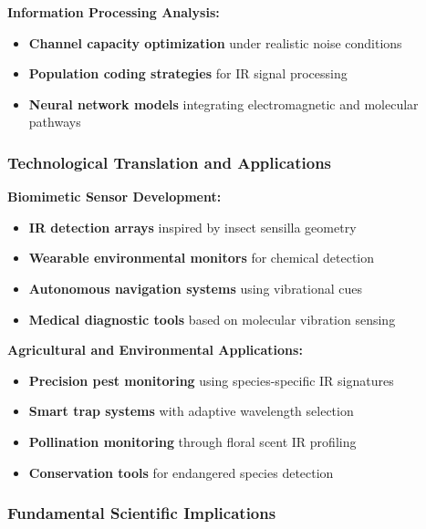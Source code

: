 \documentclass[
  13pt,
  a4paperpaper,
  12pt]{article}
\providecommand{\tightlist}{%
  \setlength{\itemsep}{0pt}\setlength{\parskip}{0pt}}
\begin{document}
\textbf{Information Processing Analysis:}

\begin{itemize}
\tightlist
\item
  \textbf{Channel capacity optimization} under realistic noise
  conditions
\item
  \textbf{Population coding strategies} for IR signal processing
\item
  \textbf{Neural network models} integrating electromagnetic and
  molecular pathways
\end{itemize}

\subsubsection{Technological Translation and
Applications}\label{technological-translation-and-applications}

\textbf{Biomimetic Sensor Development:}

\begin{itemize}
\tightlist
\item
  \textbf{IR detection arrays} inspired by insect sensilla geometry
\item
  \textbf{Wearable environmental monitors} for chemical detection
\item
  \textbf{Autonomous navigation systems} using vibrational cues
\item
  \textbf{Medical diagnostic tools} based on molecular vibration sensing
\end{itemize}

\textbf{Agricultural and Environmental Applications:}

\begin{itemize}
\tightlist
\item
  \textbf{Precision pest monitoring} using species-specific IR
  signatures
\item
  \textbf{Smart trap systems} with adaptive wavelength selection
\item
  \textbf{Pollination monitoring} through floral scent IR profiling
\item
  \textbf{Conservation tools} for endangered species detection
\end{itemize}

\subsubsection{Fundamental Scientific
Implications}\label{fundamental-scientific-implications}
\end{document}
